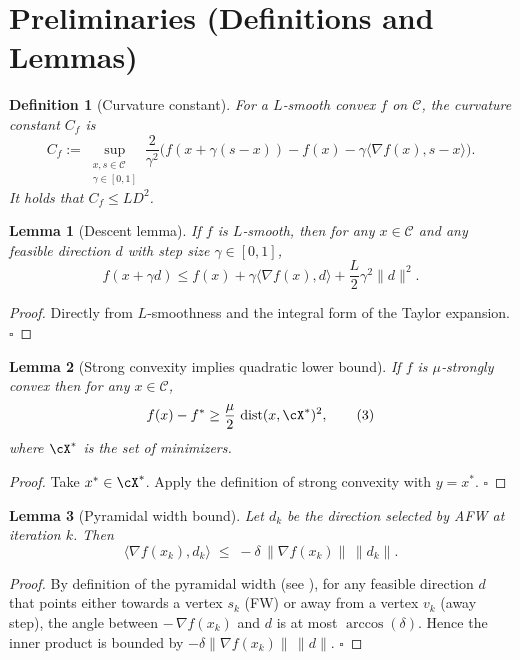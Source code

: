\documentclass{article}
\newtheorem{lemma}{Lemma}[section]
\newtheorem{definition}{Definition}[section]
\newcommand{\cC}{\mathcal{C}}
\newcommand{\dist}{\operatorname{dist}}
\newcommand{\inner}[2]{\langle #1,#2\rangle}
\begin{document}
\section*{Preliminaries (Definitions and Lemmas)}

\begin{definition}[Curvature constant]\label{def:curv}
For a $L$‑smooth convex $f$ on $\cC$, the curvature constant $C_{f}$ is
\[
C_{f}:=\sup_{\substack{x,s\in\cC\\ \gamma\in[0,1]}}
\frac{2}{\gamma^{2}}\bigl(f(x+\gamma(s-x))-f(x)-\gamma\inner{\nabla f(x)}{s-x}\bigr).
\]
It holds that $C_{f}\le L D^{2}$.
\end{definition}

\begin{lemma}[Descent lemma]\label{lem:descent}
If $f$ is $L$‑smooth, then for any $x\in\cC$ and any feasible direction $d$ with step size $\gamma\in[0,1]$,
\[
f(x+\gamma d)\le f(x)+\gamma\inner{\nabla f(x)}{d}+ \frac{L}{2}\gamma^{2}\|d\|^{2}.
\tag{2}
\]
\end{lemma}
\begin{proof}
Directly from $L$‑smoothness and the integral form of the Taylor expansion. $\square$
\end{proof}

\begin{lemma}[Strong convexity implies quadratic lower bound]\label{lem:strong}
If $f$ is $\mu$‑strongly convex then for any $x\in\cC$,
\[
f(x)-f^{*}\ge \frac{\mu}{2}\,\dist(x,\cX^{*})^{2},
\tag{3}
\]
where $\cX^{*}$ is the set of minimizers.
\end{lemma}
\begin{proof}
Take $x^{*}\in\cX^{*}$. Apply the definition of strong convexity with $y=x^{*}$. $\square$
\end{proof}

\begin{lemma}[Pyramidal width bound]\label{lem:pyr}
Let $d_{k}$ be the direction selected by AFW at iteration $k$.
Then
\[
\inner{\nabla f(x_{k})}{d_{k}}\;\le\; -\delta\,\| \nabla f(x_{k})\|\,\|d_{k}\|.
\tag{4}
\]
\end{lemma}
\begin{proof}
By definition of the pyramidal width (see \cite{lacoste2015linear}), for any feasible direction $d$ that points either towards a vertex $s_{k}$ (FW) or away from a vertex $v_{k}$ (away step), the angle between $-\,\nabla f(x_{k})$ and $d$ is at most $\arccos(\delta)$. Hence the inner product is bounded by $-\delta\| \nabla f(x_{k})\|\,\|d\|$. $\square$
\end{proof}
\end{document}

